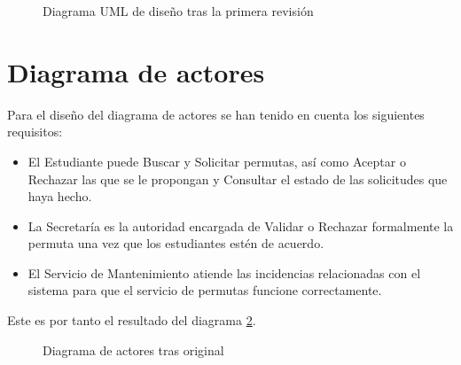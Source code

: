 \begin{figure}[htbp]
\begin{center}

\caption{Diagrama UML de diseño tras la primera revisión}
\label{fig:diseno00}
\end{center}
\end{figure}


\section{Diagrama de actores}

Para el diseño del diagrama de actores se han tenido en cuenta los siguientes requisitos:
\begin{itemize}
\item El Estudiante puede Buscar y Solicitar permutas, así como Aceptar o Rechazar las que se le propongan y Consultar el estado de las solicitudes que haya hecho.
\item La Secretaría es la autoridad encargada de Validar o Rechazar formalmente la permuta una vez que los estudiantes estén de acuerdo.
\item El Servicio de Mantenimiento atiende las incidencias relacionadas con el sistema para que el servicio de permutas funcione correctamente.
\end{itemize}

Este es por tanto el resultado del diagrama \ref{fig:diseno00}.

\begin{figure}[htbp]
\begin{center}

\caption{Diagrama de actores tras original}
\label{fig:diseno00}
\end{center}
\end{figure}